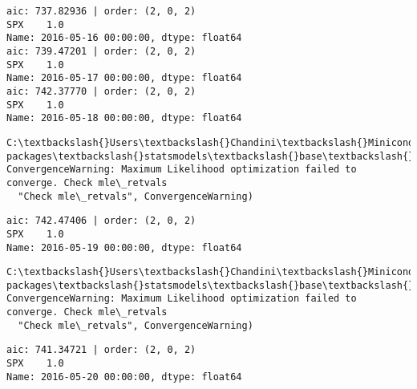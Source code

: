 \documentclass[11pt]{article}
\begin{document}
    \begin{Verbatim}[commandchars=\\\{\}]
aic: 737.82936 | order: (2, 0, 2)
SPX    1.0
Name: 2016-05-16 00:00:00, dtype: float64
aic: 739.47201 | order: (2, 0, 2)
SPX    1.0
Name: 2016-05-17 00:00:00, dtype: float64
aic: 742.37770 | order: (2, 0, 2)
SPX    1.0
Name: 2016-05-18 00:00:00, dtype: float64

    \end{Verbatim}

    \begin{Verbatim}[commandchars=\\\{\}]
C:\textbackslash{}Users\textbackslash{}Chandini\textbackslash{}Miniconda3\textbackslash{}envs\textbackslash{}auquan\textbackslash{}lib\textbackslash{}site-packages\textbackslash{}statsmodels\textbackslash{}base\textbackslash{}model.py:496: ConvergenceWarning: Maximum Likelihood optimization failed to converge. Check mle\_retvals
  "Check mle\_retvals", ConvergenceWarning)

    \end{Verbatim}

    \begin{Verbatim}[commandchars=\\\{\}]
aic: 742.47406 | order: (2, 0, 2)
SPX    1.0
Name: 2016-05-19 00:00:00, dtype: float64

    \end{Verbatim}

    \begin{Verbatim}[commandchars=\\\{\}]
C:\textbackslash{}Users\textbackslash{}Chandini\textbackslash{}Miniconda3\textbackslash{}envs\textbackslash{}auquan\textbackslash{}lib\textbackslash{}site-packages\textbackslash{}statsmodels\textbackslash{}base\textbackslash{}model.py:496: ConvergenceWarning: Maximum Likelihood optimization failed to converge. Check mle\_retvals
  "Check mle\_retvals", ConvergenceWarning)

    \end{Verbatim}

    \begin{Verbatim}[commandchars=\\\{\}]
aic: 741.34721 | order: (2, 0, 2)
SPX    1.0
Name: 2016-05-20 00:00:00, dtype: float64

    \end{Verbatim}
\end{document}
